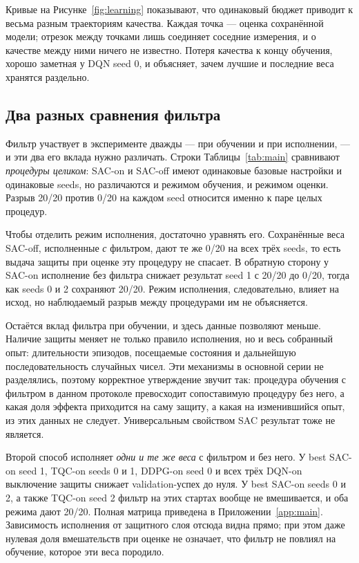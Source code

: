Кривые на Рисунке~\ref{fig:learning} показывают, что одинаковый бюджет приводит к весьма разным траекториям качества. Каждая точка — оценка сохранённой модели; отрезок между точками лишь соединяет соседние измерения, и о качестве между ними ничего не известно. Потеря качества к концу обучения, хорошо заметная у DQN seed 0, и объясняет, зачем лучшие и последние веса хранятся раздельно.

\subsection{Два разных сравнения фильтра}
Фильтр участвует в эксперименте дважды — при обучении и при исполнении, — и эти два его вклада нужно различать. Строки Таблицы~\ref{tab:main} сравнивают \emph{процедуры целиком}: SAC-on и SAC-off имеют одинаковые базовые настройки и одинаковые seeds, но различаются и режимом обучения, и режимом оценки. Разрыв 20/20 против 0/20 на каждом seed относится именно к паре целых процедур.

Чтобы отделить режим исполнения, достаточно уравнять его. Сохранённые веса SAC-off, исполненные \emph{с} фильтром, дают те же 0/20 на всех трёх seeds, то есть выдача защиты при оценке эту процедуру не спасает. В обратную сторону у SAC-on исполнение без фильтра снижает результат seed 1 с 20/20 до 0/20, тогда как seeds 0 и 2 сохраняют 20/20. Режим исполнения, следовательно, влияет на исход, но наблюдаемый разрыв между процедурами им не объясняется.

Остаётся вклад фильтра при обучении, и здесь данные позволяют меньше. Наличие защиты меняет не только правило исполнения, но и весь собранный опыт: длительности эпизодов, посещаемые состояния и дальнейшую последовательность случайных чисел. Эти механизмы в основной серии не разделялись, поэтому корректное утверждение звучит так: процедура обучения с фильтром в данном протоколе превосходит сопоставимую процедуру без него, а какая доля эффекта приходится на саму защиту, а какая на изменившийся опыт, из этих данных не следует. Универсальным свойством SAC результат тоже не является.

Второй способ исполняет \emph{одни и те же веса} с фильтром и без него. У best SAC-on seed 1, TQC-on seeds 0 и 1, DDPG-on seed 0 и всех трёх DQN-on выключение защиты снижает validation-успех до нуля. У best SAC-on seeds 0 и 2, а также TQC-on seed 2 фильтр на этих стартах вообще не вмешивается, и оба режима дают 20/20. Полная матрица приведена в Приложении~\ref{app:main}. Зависимость исполнения от защитного слоя отсюда видна прямо; при этом даже нулевая доля вмешательств при оценке не означает, что фильтр не повлиял на обучение, которое эти веса породило.

